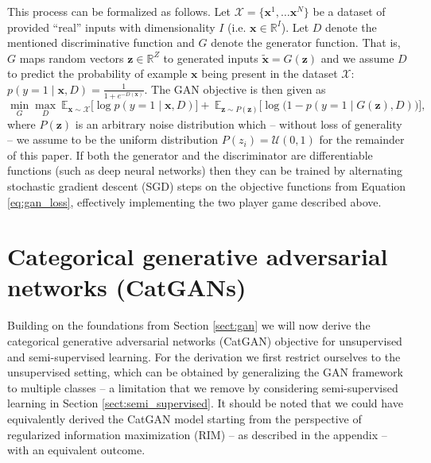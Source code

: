 \documentclass{article} \usepackage{iclr2016_conference,times}
\newcommand{\bx}{\mathbf{x}}
\newcommand{\bz}{\mathbf{z}}
\begin{document}
This process can be formalized as follows. Let $\mathcal{X} =
\lbrace \bx^1, \dots \bx^N \rbrace$ be a dataset of provided ``real'' inputs
with dimensionality $I$ (i.e. $\bx \in \mathbb{R}^I$). Let
$D$ denote the mentioned discriminative function and $G$ denote the
generator function. That is, $G$ maps random vectors $\bz \in
\mathbb{R}^Z$ to generated inputs $\tilde{\bx} = G(\bz)$ and we assume
$D$ to predict the probability of example $\bx$ being present in the
dataset $\mathcal{X}$: $p(y = 1 
\mid \bx, D) = \frac{1}{1 + e^{-D(\bx)}}$. The GAN objective is then given as
\begin{equation}
\label{eq:gan_loss}
        \min_{G}
  \max_{D} \ \mathbb{E}_{\bx \sim \mathcal{X}} \Big[
                          \log p(y=1 \mid \bx, D)
  \Big] 
        + \ \mathbb{E}_{\bz \sim P(\bz)} \Big[ \log \big ( 1 - 
                          p(y=1 \mid G(\bz),
                          D) \big )
               \Big],
\end{equation}
where $P(\bz)$ is an arbitrary noise distribution which -- without loss of
generality -- we assume to be the uniform distribution $P(z_i) =
\mathcal{U}(0,1)$ for the remainder of this paper. If both the generator
and the discriminator are differentiable functions (such as deep neural
networks) then they can be trained by alternating stochastic
gradient descent (SGD) steps on the objective functions from Equation
\eqref{eq:gan_loss}, effectively implementing the two player game
described above.

\section{Categorical generative adversarial networks (CatGANs)}
Building on the foundations from Section \ref{sect:gan} we will now
derive the categorical generative adversarial networks (CatGAN)
objective for unsupervised and semi-supervised learning. For the
derivation we first restrict ourselves to the unsupervised setting,
which can be obtained by generalizing the GAN framework to multiple
classes -- a limitation that we remove by considering semi-supervised
learning in Section \ref{sect:semi_supervised}. It should be noted
that we could have equivalently derived the CatGAN model starting from
the perspective of regularized information maximization (RIM) -- as
described in the appendix -- with an equivalent outcome.
\end{document}
